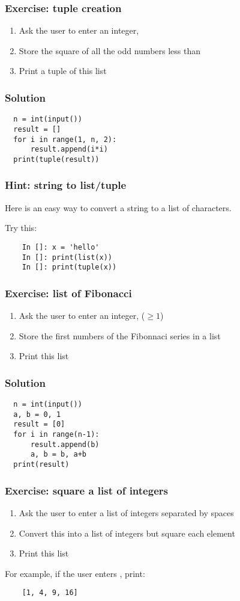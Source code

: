\documentclass[14pt,compress]{beamer}
\begin{document}
\begin{frame}[plain]
  \frametitle{Exercise: tuple creation}
  \begin{enumerate}
  \item Ask the user to enter an integer, 
  \item Store the square of all the odd numbers less than 
  \item Print a tuple of this list
  \end{enumerate}
\end{frame}

\begin{frame}
\frametitle{Solution}
\begin{lstlisting}
  n = int(input())
  result = []
  for i in range(1, n, 2):
      result.append(i*i)
  print(tuple(result))
\end{lstlisting}
\end{frame}


\begin{frame}
  \frametitle{Hint: string to list/tuple}
  Here is an easy way to convert a string to a list of characters.

  Try this:
  \begin{lstlisting}
    In []: x = 'hello'
    In []: print(list(x))
    In []: print(tuple(x))
  \end{lstlisting}
\end{frame}

\begin{frame}[plain]
  \frametitle{Exercise: list of Fibonacci}
  \begin{enumerate}
  \item Ask the user to enter an integer,  ($\geq 1$)
  \item Store the first  numbers of the Fibonnaci series in a list
  \item Print this list
  \end{enumerate}
\end{frame}

\begin{frame}
\frametitle{Solution}
\begin{lstlisting}
  n = int(input())
  a, b = 0, 1
  result = [0]
  for i in range(n-1):
      result.append(b)
      a, b = b, a+b
  print(result)
\end{lstlisting}
\end{frame}

\begin{frame}
  \frametitle{Exercise: square a list of integers}
  \begin{enumerate}
  \item Ask the user to enter a list of integers separated by spaces
  \item Convert this into a list of integers but square each element
  \item Print this list
  \end{enumerate}
  For example, if the user enters , print:
  \begin{lstlisting}
    [1, 4, 9, 16]
  \end{lstlisting}
\end{frame}
\end{document}
